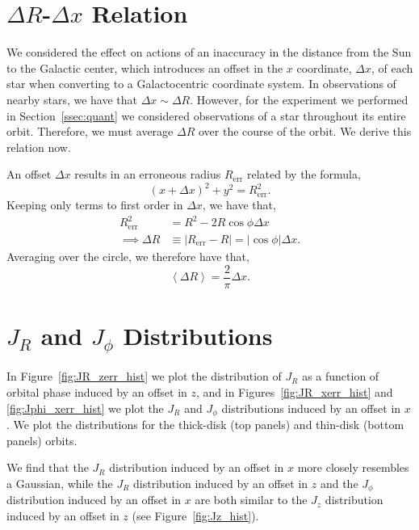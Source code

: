 \documentclass[twocolumn]{aastex62}
\newcommand{\abs}[1]{\left| #1 \right|}
\newcommand{\avg}[1]{\left< #1 \right>}
\newcommand{\beq}{\begin{equation}}
\newcommand{\eeq}{\end{equation}}
\begin{document}
\section{$\Delta R$-$\Delta x$ Relation} \label{app:deltax}
We considered the effect on actions of an inaccuracy in the distance from the
Sun to the Galactic center, which introduces an offset in the $x$ coordinate,
$\Delta x$, of each star when converting to a Galactocentric coordinate
system. In observations of nearby stars, we have that $\Delta x \sim \Delta
R$. However, for the experiment we performed in Section~\ref{ssec:quant} we
considered observations of a star throughout its entire orbit. Therefore, we
must average $\Delta R$ over the course of the orbit. We derive this relation
now.

An offset $\Delta x$ results in an erroneous radius $R_{\text{err}}$ related by
the formula,
\beq
(x+\Delta x)^2 + y^2 = R_{\text{err}}^2\text{.}
\eeq
Keeping only terms to first order in $\Delta x$, we have that,
\beq
\begin{split}
R_{\text{err}}^2 &= R^2 - 2 R \cos{\phi} \Delta x \\
\implies \Delta R &\equiv \abs{R_{\text{err}} - R} 
        = \abs{\cos{\phi}} \Delta x\text{.}
\end{split}
\eeq
Averaging over the circle, we therefore have that,
\beq
\avg{\Delta R} = \frac{2}{\pi} \Delta x\text{.}
\eeq

\section{$J_R$ and $J_{\phi}$ Distributions} \label{app:hist}

In Figure~\ref{fig:JR_zerr_hist} we plot the distribution of $J_R$ as a function of orbital phase induced by an offset in $z$, and in Figures~\ref{fig:JR_xerr_hist} and
\ref{fig:Jphi_xerr_hist} we plot the $J_R$ and $J_{\phi}$
distributions induced by an offset in $x$. We plot the distributions for the
thick-disk (top panels) and thin-disk (bottom panels) orbits.

We find that the $J_R$ distribution induced by an offset in $x$ more
closely resembles a Gaussian, while the $J_R$ distribution induced by
an offset in $z$ and the $J_{\phi}$ distribution induced by an offset
in $x$ are both similar to the $J_z$ distribution induced by an
offset in $z$ (see Figure~\ref{fig:Jz_hist}).
\end{document}
